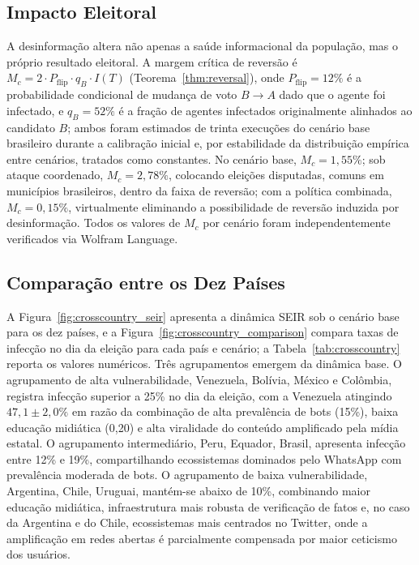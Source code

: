 \documentclass[12pt,a4paper]{article}
\theoremstyle{definition}
\theoremstyle{plain}
\begin{document}
\subsection{Impacto Eleitoral}
\label{subsec:electoral_impact}

A desinformação altera não apenas a saúde informacional da população, mas o próprio resultado eleitoral. A margem crítica de reversão é $M_c = 2 \cdot P_{\text{flip}} \cdot q_B \cdot I(T)$ (Teorema~\ref{thm:reversal}), onde $P_{\text{flip}} = 12\%$ é a probabilidade condicional de mudança de voto $B \to A$ dado que o agente foi infectado, e $q_B = 52\%$ é a fração de agentes infectados originalmente alinhados ao candidato $B$; ambos foram estimados de trinta execuções do cenário base brasileiro durante a calibração inicial e, por estabilidade da distribuição empírica entre cenários, tratados como constantes. No cenário base, $M_c = 1{,}55\%$; sob ataque coordenado, $M_c = 2{,}78\%$, colocando eleições disputadas, comuns em municípios brasileiros, dentro da faixa de reversão; com a política combinada, $M_c = 0{,}15\%$, virtualmente eliminando a possibilidade de reversão induzida por desinformação. Todos os valores de $M_c$ por cenário foram independentemente verificados via Wolfram Language.

\subsection{Comparação entre os Dez Países}
\label{subsec:results_crosscountry}

A Figura~\ref{fig:crosscountry_seir} apresenta a dinâmica SEIR sob o cenário base para os dez países, e a Figura~\ref{fig:crosscountry_comparison} compara taxas de infecção no dia da eleição para cada país e cenário; a Tabela~\ref{tab:crosscountry} reporta os valores numéricos. Três agrupamentos emergem da dinâmica base. O agrupamento de alta vulnerabilidade, Venezuela, Bolívia, México e Colômbia, registra infecção superior a 25\% no dia da eleição, com a Venezuela atingindo $47{,}1 \pm 2{,}0\%$ em razão da combinação de alta prevalência de bots (15\%), baixa educação midiática (0,20) e alta viralidade do conteúdo amplificado pela mídia estatal. O agrupamento intermediário, Peru, Equador, Brasil, apresenta infecção entre 12\% e 19\%, compartilhando ecossistemas dominados pelo WhatsApp com prevalência moderada de bots. O agrupamento de baixa vulnerabilidade, Argentina, Chile, Uruguai, mantém-se abaixo de 10\%, combinando maior educação midiática, infraestrutura mais robusta de verificação de fatos e, no caso da Argentina e do Chile, ecossistemas mais centrados no Twitter, onde a amplificação em redes abertas é parcialmente compensada por maior ceticismo dos usuários.
\end{document}
